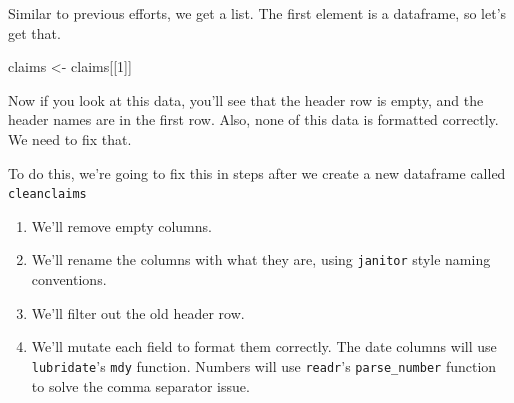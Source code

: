 \documentclass[]{book}
\newenvironment{Shaded}{\begin{snugshade}}{\end{snugshade}}
\newcommand{\DecValTok}[1]{\textcolor[rgb]{0.00,0.00,0.81}{#1}}
\newcommand{\NormalTok}[1]{#1}
\newcommand{\StringTok}[1]{\textcolor[rgb]{0.31,0.60,0.02}{#1}}
\providecommand{\tightlist}{%
  \setlength{\itemsep}{0pt}\setlength{\parskip}{0pt}}
\begin{document}
Similar to previous efforts, we get a list. The first element is a dataframe, so let's get that.

\begin{Shaded}
\begin{Highlighting}[]
\NormalTok{claims <-}\StringTok{ }\NormalTok{claims[[}\DecValTok{1}\NormalTok{]] }
\end{Highlighting}
\end{Shaded}

Now if you look at this data, you'll see that the header row is empty, and the header names are in the first row. Also, none of this data is formatted correctly. We need to fix that.

To do this, we're going to fix this in steps after we create a new dataframe called \texttt{cleanclaims}

\begin{enumerate}
\def\labelenumi{\arabic{enumi}.}
\tightlist
\item
  We'll remove empty columns.
\item
  We'll rename the columns with what they are, using \texttt{janitor} style naming conventions.
\item
  We'll filter out the old header row.
\item
  We'll mutate each field to format them correctly. The date columns will use \texttt{lubridate}'s \texttt{mdy} function. Numbers will use \texttt{readr}'s \texttt{parse\_number} function to solve the comma separator issue.
\end{enumerate}
\end{document}
